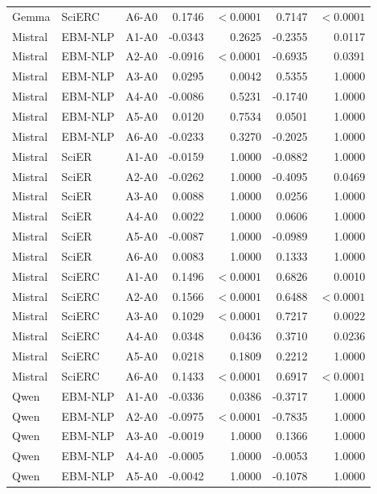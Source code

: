\documentclass[fleqn,10pt]{wlscirep-authoryear}
\begin{document}
\begin{longtable}{llcrrrr}
Gemma & SciERC & A6-A0 & 0.1746 & $<0.0001$ & 0.7147 & $<0.0001$ \\
\addlinespace[2pt]
Mistral & EBM-NLP & A1-A0 & -0.0343 & 0.2625 & -0.2355 & 0.0117 \\
Mistral & EBM-NLP & A2-A0 & -0.0916 & $<0.0001$ & -0.6935 & 0.0391 \\
Mistral & EBM-NLP & A3-A0 & 0.0295 & 0.0042 & 0.5355 & 1.0000 \\
Mistral & EBM-NLP & A4-A0 & -0.0086 & 0.5231 & -0.1740 & 1.0000 \\
Mistral & EBM-NLP & A5-A0 & 0.0120 & 0.7534 & 0.0501 & 1.0000 \\
Mistral & EBM-NLP & A6-A0 & -0.0233 & 0.3270 & -0.2025 & 1.0000 \\
\addlinespace[2pt]
Mistral & SciER & A1-A0 & -0.0159 & 1.0000 & -0.0882 & 1.0000 \\
Mistral & SciER & A2-A0 & -0.0262 & 1.0000 & -0.4095 & 0.0469 \\
Mistral & SciER & A3-A0 & 0.0088 & 1.0000 & 0.0256 & 1.0000 \\
Mistral & SciER & A4-A0 & 0.0022 & 1.0000 & 0.0606 & 1.0000 \\
Mistral & SciER & A5-A0 & -0.0087 & 1.0000 & -0.0989 & 1.0000 \\
Mistral & SciER & A6-A0 & 0.0083 & 1.0000 & 0.1333 & 1.0000 \\
\addlinespace[2pt]
Mistral & SciERC & A1-A0 & 0.1496 & $<0.0001$ & 0.6826 & 0.0010 \\
Mistral & SciERC & A2-A0 & 0.1566 & $<0.0001$ & 0.6488 & $<0.0001$ \\
Mistral & SciERC & A3-A0 & 0.1029 & $<0.0001$ & 0.7217 & 0.0022 \\
Mistral & SciERC & A4-A0 & 0.0348 & 0.0436 & 0.3710 & 0.0236 \\
Mistral & SciERC & A5-A0 & 0.0218 & 0.1809 & 0.2212 & 1.0000 \\
Mistral & SciERC & A6-A0 & 0.1433 & $<0.0001$ & 0.6917 & $<0.0001$ \\
\addlinespace[2pt]
Qwen & EBM-NLP & A1-A0 & -0.0336 & 0.0386 & -0.3717 & 1.0000 \\
Qwen & EBM-NLP & A2-A0 & -0.0975 & $<0.0001$ & -0.7835 & 1.0000 \\
Qwen & EBM-NLP & A3-A0 & -0.0019 & 1.0000 & 0.1366 & 1.0000 \\
Qwen & EBM-NLP & A4-A0 & -0.0005 & 1.0000 & -0.0053 & 1.0000 \\
Qwen & EBM-NLP & A5-A0 & -0.0042 & 1.0000 & -0.1078 & 1.0000 \\

\end{longtable}
\end{document}
